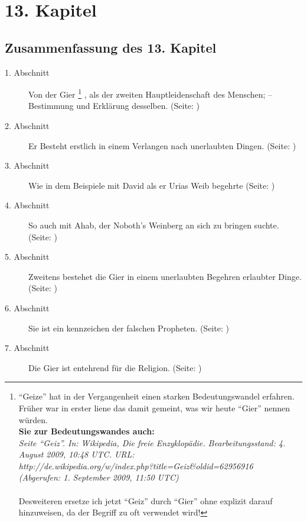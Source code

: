 


\chapter{13. Kapitel} \label{kap13}

\section{Zusammenfassung des 13. Kapitel}
\small
\begin{description}
\item[1. Abschnitt]  Von der Gier
\footnote{"`Geize"' hat in der Vergangenheit einen starken Bedeutungswandel erfahren. Früher war in erster liene das damit gemeint, was wir heute "`Gier"' nennen würden.
\\ \textbf{Sie zur Bedeutungswandes auch:}
\\ \textit{Seite "`Geiz"'. In: Wikipedia, Die freie Enzyklopädie. Bearbeitungsstand: 4. August 2009, 10:48 UTC. URL:
\\ http://de.wikipedia.org/w/index.php?title=Geiz\&oldid=62956916
\\ (Abgerufen: 1. September 2009, 11:50 UTC) }
\\ \\ Desweiteren ersetze ich jetzt "`Geiz"' durch "`Gier"' ohne explizit darauf hinzuweisen, da der Begriff zu oft verwendet wird!}
, als der zweiten Hauptleidenschaft des Menschen;
-- Bestimmung und Erklärung desselben. (Seite: \pageref{kap13_ab1})
\item[2. Abschnitt] Er Besteht erstlich in einem Verlangen nach unerlaubten
Dingen. (Seite: \pageref{kap13_ab2})
\item[3. Abschnitt] Wie in dem Beispiele mit David als er Urias Weib begehrte (Seite: \pageref{kap13_ab3})
\item[4. Abschnitt] So auch mit Ahab, der Noboth's Weinberg an sich zu bringen
suchte. (Seite: \pageref{kap13_ab4})
\item[5. Abschnitt] Zweitens bestehet die Gier in einem unerlaubten Begehren
erlaubter Dinge. (Seite: \pageref{kap13_ab5})
\item[6. Abschnitt] Sie ist ein kennzeichen der falschen Propheten. (Seite: \pageref{kap13_ab6})
\item[7. Abschnitt] Die Gier ist entehrend für die Religion. (Seite: \pageref{kap13_ab7})

\end{description}
